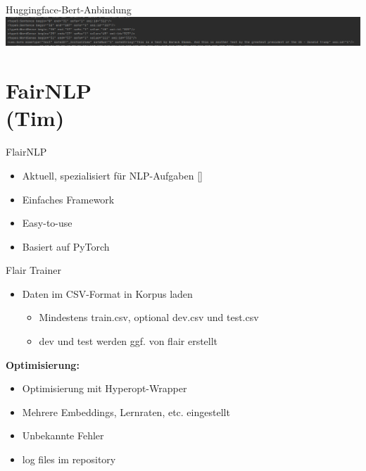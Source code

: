 \documentclass[xcolor=table]{beamer}
\begin{document}
\begin{frame}[t]{Huggingface-Bert-Anbindung}\vspace{10pt}
	\hspace*{-1cm}
	\includegraphics[scale=.25]{einbindung.png}	
\end{frame}


\section{FairNLP\\(Tim)}
\begin{frame}[t]{FlairNLP}\vspace{10pt}
\begin{itemize}
\item Aktuell, spezialisiert für NLP-Aufgaben [\cite{flair}]
\item Einfaches Framework
\item Easy-to-use
\item Basiert auf PyTorch
\end{itemize}
\end{frame}

\begin{frame}[t]{Flair Trainer}\vspace{10pt}
\begin{itemize}
\item Daten im CSV-Format in Korpus laden
\begin{itemize}
\item Mindestens train.csv, optional dev.csv und test.csv
\item dev und test werden ggf. von flair erstellt
\end{itemize}
\end{itemize}
\textbf{Optimisierung:}
\begin{itemize}
\item Optimisierung mit Hyperopt-Wrapper
\item Mehrere Embeddings, Lernraten, etc. eingestellt
\item Unbekannte Fehler
\item log files im repository
\end{itemize}
\end{frame}
\end{document}
